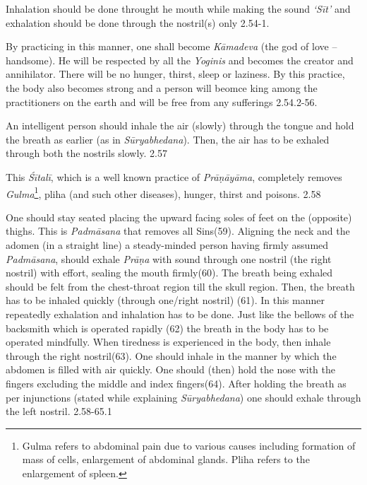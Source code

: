 
Inhalation should be done throught he mouth while making the sound \textit{‘Sīt’} and exhalation should be done through the nostril(s) only 2.54-1.


By practicing in this manner, one shall become \textit{Kāmadeva} (the god of love – handsome). He will be respected by all the \textit{Yoginis} and becomes the creator and annihilator. There will be no hunger, thirst, sleep or laziness. By this practice, the body also becomes strong and a person will beomce king among the practitioners on the earth and will be free from any sufferings 2.54.2-56.


An intelligent person should inhale the air (slowly) through the tongue and hold the breath as earlier (as in \textit{Sūryabhedana}). Then, the air has to be exhaled through both the nostrils slowly.  2.57


This \textit{Śītalī}, which is a well known practice of \textit{Prāṇāyāma}, completely removes \textit{Gulma}\footnote{Gulma refers to abdominal pain due to various causes including formation of mass of cells, enlargement of abdominal glands. Pliha refers to the enlargement of spleen.}, pliha (and such other diseases), hunger, thirst and poisons.  2.58


One should stay seated placing the upward facing soles of feet on the (opposite) thighs. This is \textit{Padmāsana} that removes all Sins(59). Aligning the neck and the adomen (in a straight line) a steady-minded person having firmly assumed \textit{Padmāsana}, should exhale \textit{Prāṇa} with sound through one nostril (the right nostril) with effort, sealing the mouth firmly(60). The breath being exhaled should be felt from the chest-throat region till the skull region. Then, the breath has to be inhaled quickly (through one/right nostril) (61). In this manner repeatedly exhalation and inhalation has to be done. Just like the bellows of the backsmith which is operated rapidly (62) the breath in the body has to be operated mindfully. When tiredness is experienced in the body, then inhale through the right nostril(63). One should inhale in the manner by which the abdomen is filled with air quickly. One should (then) hold the nose with the fingers excluding the middle and index fingers(64). After holding the breath as per injunctions (stated while explaining \textit{Sūryabhedana}) one should exhale through the left nostril. 2.58-65.1

